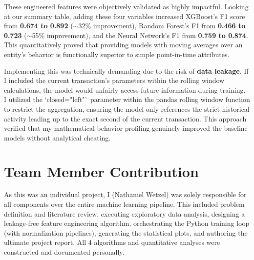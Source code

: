 \documentclass[11pt]{article}
\begin{document}
These engineered features were objectively validated as highly impactful. Looking at our summary table, adding these four variables increased XGBoost's F1 score from \textbf{0.674 to 0.892} ($\sim$32\% improvement), Random Forest's F1 from \textbf{0.466 to 0.723} ($\sim$55\% improvement), and the Neural Network's F1 from \textbf{0.759 to 0.874}. This quantitatively proved that providing models with moving averages over an entity's behavior is functionally superior to simple point-in-time attributes. 

Implementing this was technically demanding due to the risk of \textbf{data leakage}. If I included the current transaction's parameters within the rolling window calculations, the model would unfairly access future information during training. I utilized the `closed="left"` parameter within the pandas rolling window function to restrict the aggregation, ensuring the model only references the strict historical activity leading up to the exact second of the current transaction. This approach verified that my mathematical behavior profiling genuinely improved the baseline models without analytical cheating.

\section{Team Member Contribution}
As this was an individual project, I (Nathaniel Wetzel) was solely responsible for all components over the entire machine learning pipeline. This included problem definition and literature review, executing exploratory data analysis, designing a leakage-free feature engineering algorithm, orchestrating the Python training loop (with normalization pipelines), generating the statistical plots, and authoring the ultimate project report. All 4 algorithms and quantitative analyses were constructed and documented personally. 
\end{document}
